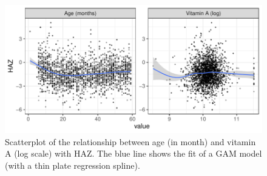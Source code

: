\documentclass[11pt,]{article}
\begin{document}
\begin{figure}[H]

{\centering \includegraphics{skeleton_files/figure-latex/individual_rel-1} 

}

\caption{Scatterplot of the relationship between age (in month) and vitamin A (log scale) with HAZ. The blue line shows the fit of a GAM model (with a thin plate regression spline).}\label{fig:individual_rel}
\end{figure}
\end{document}
